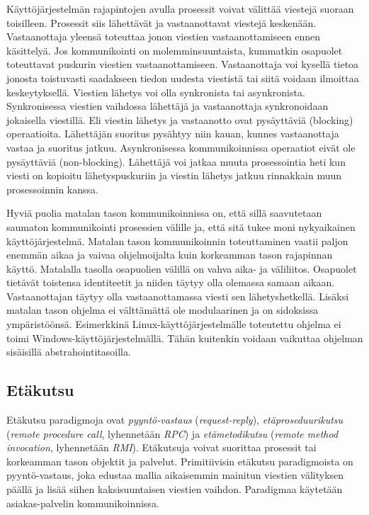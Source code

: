 Käyttöjärjestelmän rajapintojen avulla prosessit voivat välittää viestejä suoraan toisilleen. Prosessit siis lähettävät ja vastaanottavat viestejä keskenään. Vastaanottaja yleensä toteuttaa jonon viestien vastaanottamiseen ennen käsittelyä. Jos kommunikointi on molemminsuuntaista, kummatkin osapuolet toteuttavat puskurin viestien vastaanottamiseen. Vastaanottaja voi kysellä tietoa jonosta toistuvasti saadakseen tiedon uudesta viestistä tai siitä voidaan ilmoittaa keskeytyksellä. Viestien lähetys voi olla synkronista tai asynkronista. Synkronisessa viestien vaihdossa lähettäjä ja vastaanottaja synkronoidaan jokaisella viestillä. Eli viestin lähetys ja vastaanotto ovat pysäyttäviä (blocking) operaatioita. Lähettäjän suoritus pysähtyy niin kauan, kunnes vastaanottaja vastaa ja suoritus jatkuu. Asynkronisessa kommunikoinnissa operaatiot eivät ole pysäyttäviä (non-blocking). Lähettäjä voi jatkaa muuta prosessointia heti kun viesti on kopioitu lähetyspuskuriin ja viestin lähetys jatkuu rinnakkain muun prosessoinnin kanssa. \mbox{\cite[s.~147--148]{distributed-systems-concepts-and-design}}

Hyviä puolia matalan tason kommunikoinnissa on, että sillä saavutetaan saumaton kommunikointi prosessien välille ja, että sitä tukee moni nykyaikainen käyttöjärjestelmä. Matalan tason kommunikoinnin toteuttaminen vaatii paljon enemmän aikaa ja vaivaa ohjelmoijalta kuin korkeamman tason rajapinnan käyttö. Matalalla tasolla osapuolien välillä on vahva aika- ja väliliitos. Osapuolet tietävät toistensa identiteetit ja niiden täytyy olla olemassa samaan aikaan. Vastaanottajan täytyy olla vastaanottamassa viesti sen lähetyshetkellä. Lisäksi matalan tason ohjelma ei välttämättä ole modulaarinen ja on sidoksissa ympäristöönsä. Esimerkkinä Linux-käyt\-tö\-jär\-jes\-tel\-mäl\-le toteutettu ohjelma ei toimi Windows-käyttöjärjestelmällä. Tähän kuitenkin voidaan vaikuttaa ohjelman sisäisillä abstrahointitasoilla.


\subsection{Etäkutsu}
\label{ch:remote-invocation}
Etäkutsu paradigmoja ovat \emph{pyyntö-vastaus} (\emph{request-reply}), \emph{etäproseduurikutsu} (\emph{remote procedure call}, lyhennetään \emph{RPC}) ja \emph{etämetodikutsu} (\emph{remote method invocation}, lyhennetään \emph{RMI}). Etäkutsuja voivat suorittaa prosessit tai korkeamman tason objektit ja palvelut. Primitiivisin etäkutsu paradigmoista on pyyntö-vastaus, joka edustaa mallia aikaisemmin mainitun viestien välityksen päällä ja lisää siihen kaksisuuntaisen viestien vaihdon. Paradigmaa käytetään asiakas-palvelin kommunikoinnissa. \mbox{\cite[s.~185--186]{distributed-systems-concepts-and-design}}

